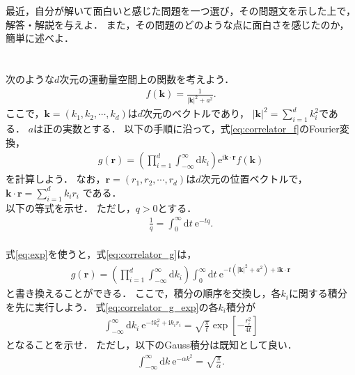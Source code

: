 \documentclass[a4paper,12pt]{jsarticle}
\begin{document}
\section{}
\label{sec:any_problem}
最近，自分が解いて面白いと感じた問題を一つ選び，その問題文を示した上で，解答・解説を与えよ．
また，その問題のどのような点に面白さを感じたのか，簡単に述べよ．

\section{}
\label{sec:oz_formula}

次のような$d$次元の運動量空間上の関数を考えよう．
\begin{align}
\label{eq:correlator_f}
    f(\bm{k})=\frac{1}{|\bm{k}|^{2}+a^{2}}.
\end{align}
ここで，$\bm{k}=(k_{1},k_{2},\cdots,k_{d})$は$d$次元のベクトルであり，
$|\bm{k}|^{2}=\sum_{i=1}^{d}k_{i}^{2}$である．
$a$は正の実数とする．
以下の手順に沿って，式\eqref{eq:correlator_f}のFourier変換，
\begin{align}
\label{eq:correlator_g}
    g(\bm{r})
    =
    \left(\prod_{i=1}^{d}\int^{\infty}_{-\infty}\mathrm{d}k_{i}\right)
    \mathrm{e}^{\mathrm{i}\bm{k}\cdot\bm{r}}
    f(\bm{k})
\end{align}
を計算しよう．
なお，$\bm{r}=(r_{1},r_{2},\cdots,r_{d})$は$d$次元の位置ベクトルで，
$\bm{k}\cdot\bm{r}=\sum_{i=1}^{d}k_{i}r_{i}$
である．\\

以下の等式を示せ．
ただし，$q>0$とする．
\begin{align}
\label{eq:exp}
    \frac{1}{q}
    =
    \int^{\infty}_{0}\mathrm{d}t~\mathrm{e}^{-tq}.
\end{align}
\\

式\eqref{eq:exp}を使うと，式\eqref{eq:correlator_g}は，
\begin{align}
\label{eq:correlator_g_exp}
    g(\bm{r})
    =
    \left(\prod_{i=1}^{d}\int^{\infty}_{-\infty}\mathrm{d}k_{i}\right)
    \int^{\infty}_{0}\mathrm{d}t
    ~\mathrm{e}^{-t\left(|\bm{k}|^{2}+a^{2}\right)+\mathrm{i}\bm{k}\cdot\bm{r}}
\end{align}
と書き換えることができる．
ここで，積分の順序を交換し，各$k_{i}$に関する積分を先に実行しよう．
式\eqref{eq:correlator_g_exp}の各$k_{i}$積分が
\begin{align}
\label{eq:int_k}
    \int^{\infty}_{-\infty}\mathrm{d}k_{i}
    ~\mathrm{e}^{-tk_{i}^{2}+\mathrm{i}k_{i}r_{i}}
    =
    \sqrt{\frac{\pi}{t}}
    \exp\left[
        -\frac{r_{i}^{2}}{4t}
    \right]
\end{align}
となることを示せ．
ただし，以下のGauss積分は既知として良い．
\begin{align}
    \int^{\infty}_{-\infty}\mathrm{d}k
    ~\mathrm{e}^{-\alpha k^{2}}
    =
    \sqrt{\frac{\pi}{\alpha}}.
\end{align}
\\
\end{document}
